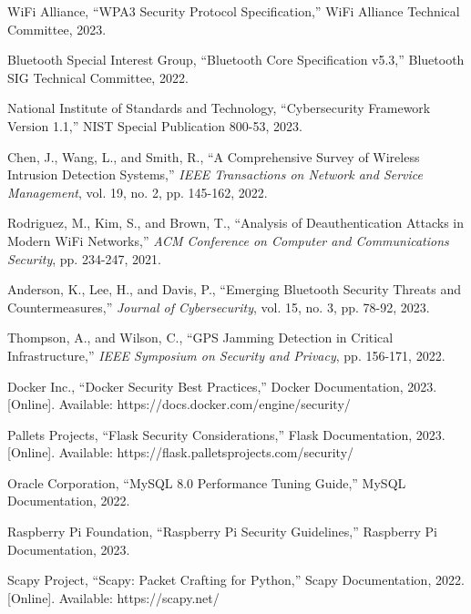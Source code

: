 \documentclass[12pt,a4paper]{report}
\begin{document}
\begin{thebibliography}{99}

WiFi Alliance, ``WPA3 Security Protocol Specification,'' WiFi Alliance Technical Committee, 2023.

Bluetooth Special Interest Group, ``Bluetooth Core Specification v5.3,'' Bluetooth SIG Technical Committee, 2022.

National Institute of Standards and Technology, ``Cybersecurity Framework Version 1.1,'' NIST Special Publication 800-53, 2023.

Chen, J., Wang, L., and Smith, R., ``A Comprehensive Survey of Wireless Intrusion Detection Systems,'' \textit{IEEE Transactions on Network and Service Management}, vol. 19, no. 2, pp. 145-162, 2022.

Rodriguez, M., Kim, S., and Brown, T., ``Analysis of Deauthentication Attacks in Modern WiFi Networks,'' \textit{ACM Conference on Computer and Communications Security}, pp. 234-247, 2021.

Anderson, K., Lee, H., and Davis, P., ``Emerging Bluetooth Security Threats and Countermeasures,'' \textit{Journal of Cybersecurity}, vol. 15, no. 3, pp. 78-92, 2023.

Thompson, A., and Wilson, C., ``GPS Jamming Detection in Critical Infrastructure,'' \textit{IEEE Symposium on Security and Privacy}, pp. 156-171, 2022.

Docker Inc., ``Docker Security Best Practices,'' Docker Documentation, 2023. [Online]. Available: https://docs.docker.com/engine/security/

Pallets Projects, ``Flask Security Considerations,'' Flask Documentation, 2023. [Online]. Available: https://flask.palletsprojects.com/security/

Oracle Corporation, ``MySQL 8.0 Performance Tuning Guide,'' MySQL Documentation, 2022.

Raspberry Pi Foundation, ``Raspberry Pi Security Guidelines,'' Raspberry Pi Documentation, 2023.

Scapy Project, ``Scapy: Packet Crafting for Python,'' Scapy Documentation, 2022. [Online]. Available: https://scapy.net/


\end{thebibliography}
\end{document}
